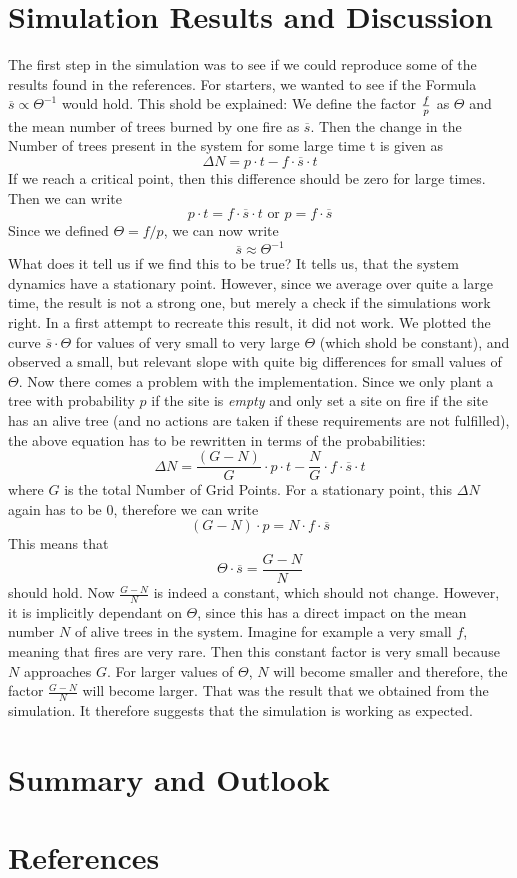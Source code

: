 \documentclass[11pt]{article}
\begin{document}
\section{Simulation Results and Discussion}
The first step in the simulation was to see if we could reproduce some of the results found in the references. For starters, we wanted to see if the Formula $\overline s \varpropto  \Theta^{-1}$ would hold. This shold be explained: We define the factor $f \over p$ as $\Theta$ and the mean number of trees burned by one fire as $\overline s$. Then the change in the Number of trees present in the system for some large time t is given as $$\Delta N = p\cdot t - f\cdot \overline s \cdot t$$ 
If we reach a critical point, then this difference should be zero for large times. Then we can write $$p\cdot t = f\cdot \overline s \cdot t \mbox{ or }p=f\cdot \overline s$$ 
Since we defined $\Theta = f / p$, we can now write $$\overline s \approx \Theta ^{-1}$$
What does it tell us if we find this to be true? It tells us, that the system dynamics have a stationary point. However, since we average over quite a large time, the result is not a strong one, but merely a check if the simulations work right.
In a first attempt to recreate this result, it did not work. We plotted the curve $\overline s \cdot \Theta $ for values of very small to very large $\Theta$ (which shold be constant), and observed a small, but relevant slope with quite big differences for small values of $\Theta$. 
Now there comes a problem with the implementation. Since we only plant a tree with probability $p$ if the site is \emph{empty} and only set a site on fire if the site has an alive tree (and no actions are taken if these requirements are not fulfilled), the above equation has to be rewritten in terms of the probabilities: $$\Delta N= \frac{(G-N)} {G} \cdot p\cdot t- \frac{N}{G} \cdot f\cdot \overline s\cdot t$$
where $G$ is the total Number of Grid Points. For a stationary point, this $\Delta N$ again has to be $0$, therefore we can write $$(G-N)\cdot p = N\cdot f \cdot \overline s$$
This means that $$\Theta \cdot \overline s=\frac{G-N}{N}$$ should hold. Now $\frac {G-N}{N}$ is indeed a constant, which should not change. However, it is implicitly dependant on $\Theta$, since this has a direct impact on the mean number $N$ of alive trees in the system. Imagine for example a very small $f$, meaning that fires are very rare. Then this constant factor is very small because $N$ approaches $G$. For larger values of $\Theta$, $N$ will become smaller and therefore, the factor $\frac{G-N}{N}$ will become larger. 
That was the result that we obtained from the simulation. It therefore suggests that the simulation is working as expected. 

\section{Summary and Outlook}

\section{References}
\end{document}

